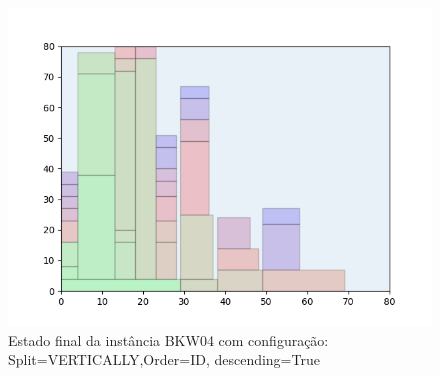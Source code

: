 \begin{figure}[H]
    \centering
    \caption[]{Estado final da instância BKW04 com configuração: Split=VERTICALLY,Order=ID, descending=True}
    \label{fig:bkw04-vertically-id-true}
    \includegraphics[scale=0.5]{output/figures/bkw/bkw04/vertically/id/true/00}
\end{figure}